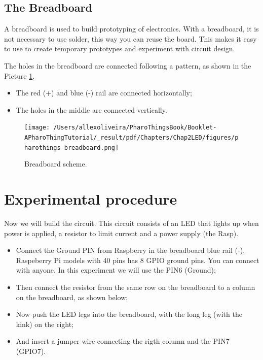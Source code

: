 \documentclass[10pt,twoside,english]{_support/latex/sbabook/sbabook}
\begin{document}
\subsection{The Breadboard}
A breadboard is used to build prototyping of electronics. With a breadboard, it is not necessary to use solder, this way you can reuse the board. This makes it easy to use to create temporary prototypes and experiment with circuit design.

The holes in the breadboard are connected following a pattern, as shown in the Picture \ref{Breadboard}.

\begin{itemize}
\item The red (+) and blue (-) rail are connected horizontally;
\item The holes in the middle are connected vertically.
\end{itemize}


\begin{figure}

\begin{center}
\texttt{[image: /Users/allexoliveira/PharoThingsBook/Booklet-APharoThingTutorial/\_result/pdf/Chapters/Chap2LED/figures/pharothings-breadboard.png]}\caption{Breadboard scheme.\label{Breadboard}}\end{center}
\end{figure}

\section{Experimental procedure}
Now we will build the circuit. This circuit consists of an LED that lights up when power is applied, a resistor to limit current and a power supply (the Rasp).

\begin{itemize}
\item Connect the Ground PIN from Raspberry in the breadboard blue rail (-). Raspeberry Pi models with 40 pins has 8 GPIO ground pins. You can connect with anyone. In this experiment we will use the PIN6 (Ground);
\item Then connect the resistor from the same row on the breadboard to a column on the breadboard, as shown below;
\item Now push the LED legs into the breadboard, with the long leg (with the kink) on the right;
\item And insert a jumper wire connecting the rigth column and the PIN7 (GPIO7).
\end{itemize}
\end{document}
